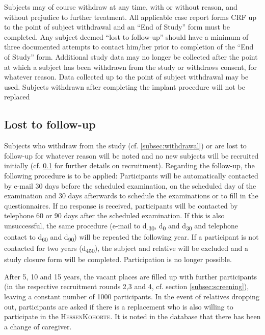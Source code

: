 Subjects may of course withdraw at any time, with or without reason, and without prejudice to further treatment. All applicable case report forms \ac{CRF} up to the point of subject withdrawal and an ``End of Study'' form must be completed. Any subject deemed ``lost to follow-up'' should have a minimum of three documented attempts to contact him/her prior to completion of the ``End of Study'' form. Additional study data may no longer be collected after the point at which a subject has been withdrawn from the study or withdraws consent, for whatever reason. Data collected up to the point of subject withdrawal may be used. Subjects withdrawn after completing the implant procedure will not be replaced 

\subsection{Lost to follow-up}
Subjects who withdraw from the study (cf. \ref{subsec:withdrawal}) or are lost to follow-up for whatever reason will be noted and no new subjects will be recruited initially (cf. \ref{} for further details on recruitment). Regarding the follow-up, the following procedure is to be applied: Participants will be automatically contacted by e-mail 30 days before the scheduled examination, on the scheduled day of the examination and 30 days afterwards to schedule the examinations or to fill in the questionnaires. If no response is received, participants will be contacted by telephone 60 or 90 days after the scheduled examination. If this is also unsuccessful, the same procedure (e-mail to d\textsubscript{-30}, d\textsubscript{0} and d\textsubscript{30} and telephone contact to d\textsubscript{60} and d\textsubscript{90}) will be repeated the following year. If a participant is not contacted for two years (d\textsubscript{450}), the subject and relative will be excluded and a study closure form will be completed. Participation is no longer possible. 

After 5, 10 and 15 years, the vacant places are filled up with further participants (in the respective recruitment rounds 2,3 and 4, cf. section \ref{subsec:screening}), leaving a constant number of \SI{1000}{} participants. In the event of relatives dropping out, participants are asked if there is a replacement who is also willing to participate in the \textsc{HessenKohorte}. It is noted in the database that there has been a change of caregiver. 

